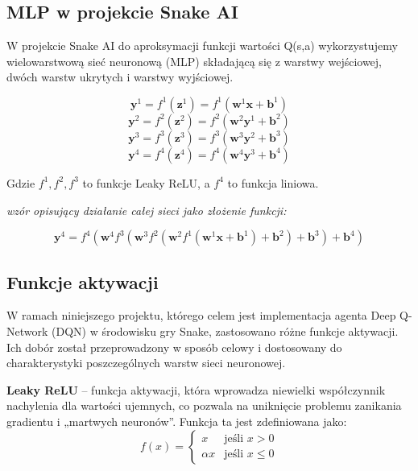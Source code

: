 \documentclass[a4paper,12pt]{article}
\begin{document}
\cite{RZajdelMLP}


\subsection{MLP w projekcie Snake AI}
W projekcie Snake AI do aproksymacji funkcji wartości Q(s,a) wykorzystujemy wielowarstwową sieć neuronową (MLP) składającą się z warstwy wejściowej, dwóch warstw ukrytych i warstwy wyjściowej. 

\begin{equation}
\mathbf{y}^{1} = f^{1}(\mathbf{z}^{1}) = f^{1}(\mathbf{w}^{1} \mathbf{x} + \mathbf{b}^{1}) 
\end{equation}
\begin{equation}
\mathbf{y}^{2} = f^{2}(\mathbf{z}^{2}) = f^{2}(\mathbf{w}^{2} \mathbf{y}^{1} + \mathbf{b}^{2}) 
\end{equation}
\begin{equation}
\mathbf{y}^{3} = f^{3}(\mathbf{z}^{3}) = f^{3}(\mathbf{w}^{3} \mathbf{y}^{2} + \mathbf{b}^{3}) 
\end{equation}
\begin{equation}
\mathbf{y}^{4} = f^{4}(\mathbf{z}^{4}) = f^{4}(\mathbf{w}^{4} \mathbf{y}^{3} + \mathbf{b}^{4})
\end{equation}

Gdzie \(f^{1}, f^{2}, f^{3}\) to funkcje Leaky ReLU, a \(f^{4}\) to funkcja liniowa.

\textit{wzór opisujący działanie całej sieci jako złożenie funkcji:}

\begin{equation}
\mathbf{y}^{4} = f^{4}\left( \mathbf{w}^{4} f^{3} \left( \mathbf{w}^{3} f^{2} \left( \mathbf{w}^{2} f^{1}(\mathbf{w}^{1} \mathbf{x} + \mathbf{b}^{1}) + \mathbf{b}^{2} \right) + \mathbf{b}^{3} \right) + \mathbf{b}^{4} \right)
\end{equation}

\subsection{Funkcje aktywacji}

W ramach niniejszego projektu, którego celem jest implementacja agenta Deep Q-Network (DQN) w środowisku gry Snake, zastosowano różne funkcje aktywacji. Ich dobór został przeprowadzony w sposób celowy i dostosowany do charakterystyki poszczególnych warstw sieci neuronowej.

\textbf{Leaky ReLU} – funkcja aktywacji, która wprowadza niewielki współczynnik nachylenia dla wartości ujemnych, co pozwala na uniknięcie problemu zanikania gradientu i „martwych neuronów”. Funkcja ta jest zdefiniowana jako:
\begin{equation}
f(x) = \begin{cases}
x & \text{jeśli } x > 0 \\
\alpha x & \text{jeśli } x \leq 0
\end{cases}
\end{equation}
\end{document}
